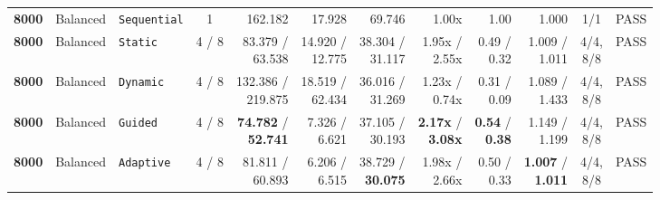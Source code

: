 \documentclass[11pt,a4paper]{article}
\renewcommand{\_}{\textunderscore\allowbreak}
\begin{document}
\begin{table}[H]
{\begin{tabular}{r l l c r r r r r r c c}
\textbf{8000} & Balanced & \texttt{Sequential} & 1 & 162.182 & 17.928 & 69.746 & 1.00x & 1.00 & 1.000 & 1/1 & PASS \\
\textbf{8000} & Balanced & \texttt{Static} & 4 / 8 & \makecell[r]{83.379 /\\ 63.538} & \makecell[r]{14.920 /\\ 12.775} & \makecell[r]{38.304 /\\ 31.117} & \makecell[r]{1.95x /\\ 2.55x} & \makecell[r]{0.49 /\\ 0.32} & \makecell[r]{1.009 /\\ 1.011} & \makecell[c]{4/4,\\ 8/8} & PASS \\
\textbf{8000} & Balanced & \texttt{Dynamic} & 4 / 8 & \makecell[r]{132.386 /\\ 219.875} & \makecell[r]{18.519 /\\ 62.434} & \makecell[r]{36.016 /\\ 31.269} & \makecell[r]{1.23x /\\ 0.74x} & \makecell[r]{0.31 /\\ 0.09} & \makecell[r]{1.089 /\\ 1.433} & \makecell[c]{4/4,\\ 8/8} & PASS \\
\textbf{8000} & Balanced & \texttt{Guided} & 4 / 8 & \makecell[r]{\textbf{74.782} /\\ \textbf{52.741}} & \makecell[r]{7.326 /\\ 6.621} & \makecell[r]{37.105 /\\ 30.193} & \makecell[r]{\textbf{2.17x} /\\ \textbf{3.08x}} & \makecell[r]{\textbf{0.54} /\\ \textbf{0.38}} & \makecell[r]{1.149 /\\ 1.199} & \makecell[c]{4/4,\\ 8/8} & PASS \\
\textbf{8000} & Balanced & \texttt{Adaptive} & 4 / 8 & \makecell[r]{81.811 /\\ 60.893} & \makecell[r]{6.206 /\\ 6.515} & \makecell[r]{38.729 /\\ \textbf{30.075}} & \makecell[r]{1.98x /\\ 2.66x} & \makecell[r]{0.50 /\\ 0.33} & \makecell[r]{\textbf{1.007} /\\ \textbf{1.011}} & \makecell[c]{4/4,\\ 8/8} & PASS \\

\end{tabular}}
\end{table}
\end{document}
